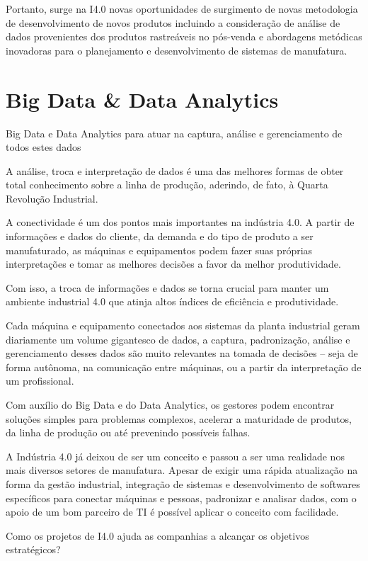 \documentclass[
	12pt,				%
	oneside,			%
	a4paper,			%
	english,			%
	brazil				%
]{abntex2}
\begin{document}
	Portanto, surge na I4.0 novas oportunidades de surgimento de novas metodologia de desenvolvimento de novos produtos incluindo a consideração de análise de dados provenientes dos produtos rastreáveis no pós-venda e abordagens metódicas inovadoras para o planejamento e desenvolvimento de sistemas de manufatura.


	\section{Big Data \& Data Analytics}

	Big Data e Data Analytics para atuar na captura, análise e gerenciamento de todos estes dados

	A análise, troca e interpretação de dados é uma das melhores formas de obter total conhecimento sobre a linha de produção, aderindo, de fato, à Quarta Revolução Industrial.

	A conectividade é um dos pontos mais importantes na indústria 4.0. A partir de informações e dados do cliente, da demanda e do tipo de produto a ser manufaturado, as máquinas e equipamentos podem fazer suas próprias interpretações e tomar as melhores decisões a favor da melhor produtividade.

	Com isso, a troca de informações e dados se torna crucial para manter um ambiente industrial 4.0 que atinja altos índices de eficiência e produtividade.

	Cada máquina e equipamento conectados aos sistemas da planta industrial geram diariamente um volume gigantesco de dados, a captura, padronização, análise e gerenciamento desses dados são muito relevantes na tomada de decisões – seja de forma autônoma, na comunicação entre máquinas, ou a partir da interpretação de um profissional.

	Com auxílio do Big Data e do Data Analytics, os gestores podem encontrar soluções simples para problemas complexos, acelerar a maturidade de produtos, da linha de produção ou até prevenindo possíveis falhas.

	A Indústria 4.0 já deixou de ser um conceito e passou a ser uma realidade nos mais diversos setores de manufatura. Apesar de exigir uma rápida atualização na forma da gestão industrial, integração de sistemas e desenvolvimento de softwares específicos para conectar máquinas e pessoas, padronizar e analisar dados, com o apoio de um bom parceiro de TI é possível aplicar o conceito com facilidade.

	Como os projetos de I4.0 ajuda as companhias a alcançar os objetivos estratégicos?
\end{document}
